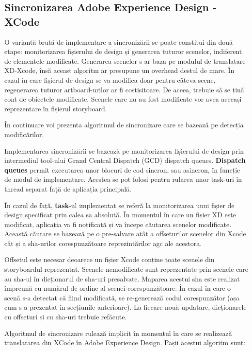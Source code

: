 \subsection{Sincronizarea Adobe Experience Design - XCode}

O variantă brută de implementare a sincronizării se poate constitui din două etape: monitorizarea fișierului de design și generarea tuturor scenelor, indiferent de elementele modificate. Generarea scenelor s-ar baza pe modulul de translatare XD-Xcode, însă aceast algoritm ar presupune un overhead destul de mare. În cazul în care fișierul de design se va modifica doar pentru câteva scene, regenerarea tuturor artboard-urilor ar fi costisitoare. De aceea, trebuie să se țină cont de obiectele modificate. Scenele care nu au fost modificate vor avea aceeași reprezentare în fișierul storyboard.

În continuare voi prezenta algoritmul de sincronizare care se bazează pe detecția modificărilor.

Implementarea sincronizării se bazează pe monitorizarea fișierului de design prin intermediul tool-ului Grand Central Dispatch (GCD) dispatch queues. \textbf{Dispatch queues} permit executarea unor blocuri de cod sincron, sau asincron, în funcție de modul de implementare. Acestea se pot folosi pentru rularea unor task-uri în thread separat față de aplicația principală. 

În cazul de față, \textbf{task}-ul implementat se referă la monitorizarea unui fișier de design specificat prin calea sa absolută. În momentul în care un fișier XD este modificat, aplicația va fi notificată și va începe căutarea scenelor modificate. 
Această căutare se bazează pe o pre-salvare atât a offseturilor scenelor din Xcode cât și a sha-urilor corespunzătoare reprezintărilor agc ale acestora. 

Offsetul este necesar deoarece un fișier Xcode conține toate scenele din storyboardul reprezentat.  Scenele nemodificate sunt reprezentate prin scenele care au sha-ul în dicționarul de sha-uri presalvate. Maparea acestui sha este realizat împreună cu numărul de ordine al scenei corespunzătoare. 
În cazul în care o scenă s-a detectat că fiind modificată, se re-generează codul corespunzător (așa cum s-a prezentat în secțiunile anterioare).  La fiecare nouă updatare, dicționarele cu offseturi și cu sha-uri trebuie refăcute.

Algoritmul de sincronizare rulează implicit în momentul în care se realizează translatarea din XCode în Adobe Experience Design. Pașii acestui algoritm sunt:

